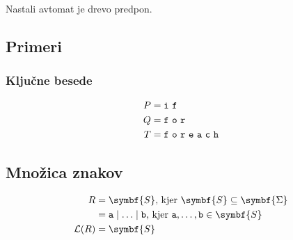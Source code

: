 \documentclass{report}
\newcounter{example}
\newcommand{\N}[1]{#1}
\newcommand{\Reset}{\setcounter{example}{1}}
\newcommand{\Language}[1]{\mathcal{L}(#1)}
\newcommand{\Char}[1]{\texttt{#1}}
\newcommand{\Pos}{\mathop{\mdsmblkcircle}}
\newcommand{\Spc}{\ }
\newcommand{\Union}{\mathrel{|}}
\newcommand{\Set}[1]{\symbf{#1}}
\newcommand{\Alphabet}{\Set{\Sigma}}
\newcommand{\RE}[1]{{\uppercase{#1}}}
\begin{document}
\begin{center}
\end{center}

Nastali avtomat je drevo predpon.

\subsection*{Primeri}
\subsubsection{Ključne besede}

\begin{align*}
  \N{\RE{p}} &= \Char{i} \Spc \Char{f} \\
  \N{\RE{q}} &= \Char{f} \Spc \Char{o} \Spc \Char{r} \\
  \N{\RE{t}} &= \Char{f} \Spc \Char{o} \Spc \Char{r} \Spc \Char{e} \Spc \Char{a} \Spc \Char{c} \Spc \Char{h} \\
\end{align*}

\subsection{Množica znakov}
\Reset

\begin{tcolorbox}[title={Definicija}]
\begin{equation*}
  \begin{aligned}
    R &= \Set{S}\text{, kjer } \Set{S} \subseteq \Alphabet \\
    &= \Char{a} \Union \dots \Union \Char{b}\text{, kjer } \Char{a}, \dots, \Char{b} \in \Set{S}\\
    \Language{\RE{r}} &= \Set{S}
  \end{aligned}
\end{equation*}
\end{tcolorbox}
\end{document}
